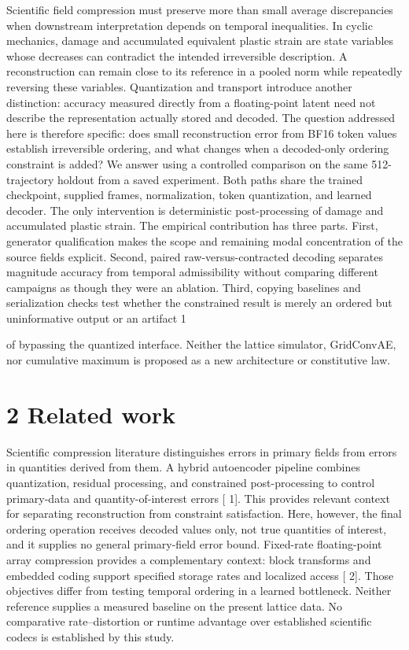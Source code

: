 \documentclass[11pt]{article}
\begin{document}
Scientific field compression must preserve more than small average discrepancies when downstream
interpretation depends on temporal inequalities. In cyclic mechanics, damage and accumulated
equivalent plastic strain are state variables whose decreases can contradict the intended irreversible
description. A reconstruction can remain close to its reference in a pooled norm while repeatedly
reversing these variables. Quantization and transport introduce another distinction: accuracy
measured directly from a floating-point latent need not describe the representation actually stored
and decoded.
The question addressed here is therefore specific: does small reconstruction error from BF16 token
values establish irreversible ordering, and what changes when a decoded-only ordering constraint
is added? We answer using a controlled comparison on the same 512-trajectory holdout from a
saved experiment. Both paths share the trained checkpoint, supplied frames, normalization, token
quantization, and learned decoder. The only intervention is deterministic post-processing of damage
and accumulated plastic strain.
The empirical contribution has three parts. First, generator qualification makes the scope and
remaining modal concentration of the source fields explicit. Second, paired raw-versus-contracted
decoding separates magnitude accuracy from temporal admissibility without comparing different
campaigns as though they were an ablation. Third, copying baselines and serialization checks
test whether the constrained result is merely an ordered but uninformative output or an artifact
1

of bypassing the quantized interface. Neither the lattice simulator, GridConvAE, nor cumulative
maximum is proposed as a new architecture or constitutive law.

\section*{2 Related work}

Scientific compression literature distinguishes errors in primary fields from errors in quantities
derived from them. A hybrid autoencoder pipeline combines quantization, residual processing,
and constrained post-processing to control primary-data and quantity-of-interest errors [ 1]. This
provides relevant context for separating reconstruction from constraint satisfaction. Here, however,
the final ordering operation receives decoded values only, not true quantities of interest, and it
supplies no general primary-field error bound.
Fixed-rate floating-point array compression provides a complementary context: block transforms
and embedded coding support specified storage rates and localized access [ 2]. Those objectives differ
from testing temporal ordering in a learned bottleneck. Neither reference supplies a measured
baseline on the present lattice data. No comparative rate–distortion or runtime advantage over
established scientific codecs is established by this study.
\end{document}
